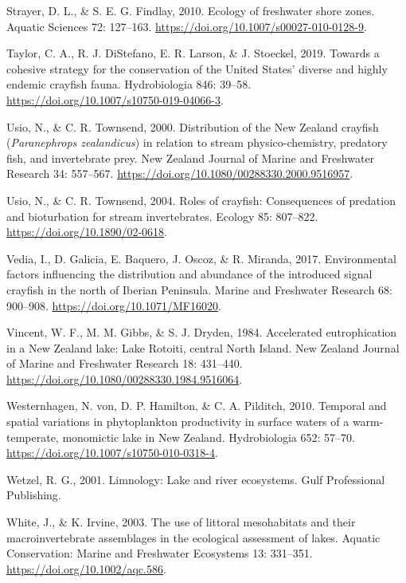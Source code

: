 \documentclass[
  letterpaper,
  DIV=11,
  numbers=noendperiod]{scrartcl}
\newlength{\cslhangindent}
\newenvironment{CSLReferences}[2] %
 {\begin{list}{}{%
  \setlength{\itemindent}{0pt}
  \setlength{\leftmargin}{0pt}
  \setlength{\parsep}{0pt}
  \ifodd #1
   \setlength{\leftmargin}{\cslhangindent}
   \setlength{\itemindent}{-1\cslhangindent}
  \fi
  \setlength{\itemsep}{#2\baselineskip}}}
 {\end{list}}
\begin{document}
\begin{CSLReferences}{0}{1}
Strayer, D. L., \& S. E. G. Findlay, 2010. Ecology of freshwater shore
zones. Aquatic Sciences 72: 127--163.
\url{https://doi.org/10.1007/s00027-010-0128-9}.

Taylor, C. A., R. J. DiStefano, E. R. Larson, \& J. Stoeckel, 2019.
Towards a cohesive strategy for the conservation of the {United States}'
diverse and highly endemic crayfish fauna. Hydrobiologia 846: 39--58.
\url{https://doi.org/10.1007/s10750-019-04066-3}.

Usio, N., \& C. R. Townsend, 2000. Distribution of the {New Zealand}
crayfish ({\emph{Paranephrops zealandicus}}) in relation to stream
physico-chemistry, predatory fish, and invertebrate prey. New Zealand
Journal of Marine and Freshwater Research 34: 557--567.
\url{https://doi.org/10.1080/00288330.2000.9516957}.

Usio, N., \& C. R. Townsend, 2004. Roles of crayfish: Consequences of
predation and bioturbation for stream invertebrates. Ecology 85:
807--822. \url{https://doi.org/10.1890/02-0618}.

Vedia, I., D. Galicia, E. Baquero, J. Oscoz, \& R. Miranda, 2017.
Environmental factors influencing the distribution and abundance of the
introduced signal crayfish in the north of {Iberian Peninsula}. Marine
and Freshwater Research 68: 900--908.
\url{https://doi.org/10.1071/MF16020}.

Vincent, W. F., M. M. Gibbs, \& S. J. Dryden, 1984. Accelerated
eutrophication in a {New Zealand} lake: {Lake Rotoiti}, central {North
Island}. New Zealand Journal of Marine and Freshwater Research 18:
431--440. \url{https://doi.org/10.1080/00288330.1984.9516064}.

Westernhagen, N. von, D. P. Hamilton, \& C. A. Pilditch, 2010. Temporal
and spatial variations in phytoplankton productivity in surface waters
of a warm-temperate, monomictic lake in {New Zealand}. Hydrobiologia
652: 57--70. \url{https://doi.org/10.1007/s10750-010-0318-4}.

Wetzel, R. G., 2001. Limnology: Lake and river ecosystems. Gulf
Professional Publishing.

White, J., \& K. Irvine, 2003. The use of littoral mesohabitats and
their macroinvertebrate assemblages in the ecological assessment of
lakes. Aquatic Conservation: Marine and Freshwater Ecosystems 13:
331--351. \url{https://doi.org/10.1002/aqc.586}.


\end{CSLReferences}
\end{document}
